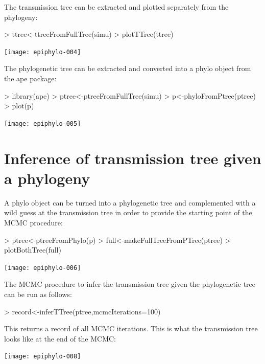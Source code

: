 \documentclass[a4paper]{article}
\begin{document}
The transmission tree can be extracted and plotted separately from the phylogeny:

\begin{Schunk}
\begin{Sinput}
> ttree<-ttreeFromFullTree(simu)
> plotTTree(ttree)
\end{Sinput}
\end{Schunk}
\texttt{[image: epiphylo-004]}

The phylogenetic tree can be extracted and converted into a phylo object from the ape package:

\begin{Schunk}
\begin{Sinput}
> library(ape)
> ptree<-ptreeFromFullTree(simu)
> p<-phyloFromPtree(ptree)
> plot(p)
\end{Sinput}
\end{Schunk}
\texttt{[image: epiphylo-005]}

\section{Inference of transmission tree given a phylogeny}

A phylo object can be turned  into a phylogenetic tree and complemented with a wild guess at the transmission tree in order to provide the starting point of the MCMC procedure:

\begin{Schunk}
\begin{Sinput}
> ptree<-ptreeFromPhylo(p)
> full<-makeFullTreeFromPTree(ptree)
> plotBothTree(full)
\end{Sinput}
\end{Schunk}
\texttt{[image: epiphylo-006]}

The MCMC procedure to infer the transmission tree given the phylogenetic tree can be run as follows:

\begin{Schunk}
\begin{Sinput}
> record<-inferTTree(ptree,mcmcIterations=100)
\end{Sinput}
\end{Schunk}

This returns a record of all MCMC iterations. This is what the transmission tree looks like at the end of the MCMC:

\begin{Schunk}
\end{Schunk}
\texttt{[image: epiphylo-008]}
\end{document}
